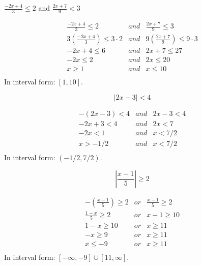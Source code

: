 \documentclass[fleqn,addpoints]{exam}
\begin{document}
\begin{questions}
\begin{solution}[4 cm]
\end{solution}

\question[5]
\( \displaystyle \frac{-2x + 4}{3} \leq 2 \) and \( \displaystyle \frac{2x + 7}{9} < 3 \)
\begin{solution}[4 cm]
\begin{eqnarray*}
  \frac{-2x + 4}{3} \leq 2            &and& \frac{2x + 7}{9} \leq 3 \\
  3 \left( \frac{-2x + 4}{3} \right) \leq 3 \cdot 2 &and& 9 \left( \frac{2x + 7}{9} \right) \leq 9 \cdot 3 \\
  -2x + 4 \leq 6                      &and& 2x + 7 \leq 27 \\
  -2x \leq 2                          &and& 2x \leq 20 \\
  x \geq 1                            &and& x \leq 10 \\
\end{eqnarray*}
In interval form: \( [1, 10] \).
\end{solution}

\ifprintanswers
\else
\pagebreak
\fi

\question[5]
\[ \left| 2x - 3 \right| < 4 \]

\begin{solution}[4 cm]
\begin{eqnarray*}
  -(2x - 3) < 4 &and& 2x - 3 < 4 \\
  -2x + 3 < 4   &and& 2x < 7 \\
  -2x < 1       &and& x < 7/2 \\
  x > -1/2      &and& x < 7/2 \\
\end{eqnarray*}
In interval form: \( (-1/2, 7/2) \).
\end{solution}

\question[5]
\[ \left| \frac{x - 1}{5} \right| \geq 2 \]
\begin{solution}[4 cm]
\begin{eqnarray*}
  -\left( \frac{x - 1}{5} \right) \geq 2 &or& \frac{x - 1}{5} \geq 2 \\
  \frac{1 - x}{5} \geq 2                 &or& x - 1 \geq 10 \\
  1 - x \geq 10                          &or& x \geq 11 \\
  -x \geq 9                              &or& x \geq 11 \\
  x \leq -9                              &or& x \geq 11 \\
\end{eqnarray*}
In interval form: \( [-\infty, -9] \cup [11, \infty] \).


\end{solution}
\end{questions}
\end{document}
